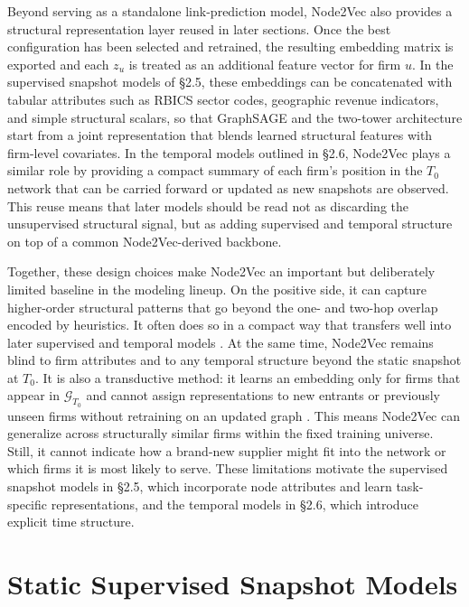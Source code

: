 Beyond serving as a standalone link-prediction model, Node2Vec also provides a structural representation layer reused in later sections. Once the best configuration has been selected and retrained, the resulting embedding matrix is exported and each \(z_u\) is treated as an additional feature vector for firm \(u\). In the supervised snapshot models of \S2.5, these embeddings can be concatenated with tabular attributes such as RBICS sector codes, geographic revenue indicators, and simple structural scalars, so that GraphSAGE and the two-tower architecture start from a joint representation that blends learned structural features with firm-level covariates. In the temporal models outlined in \S2.6, Node2Vec plays a similar role by providing a compact summary of each firm's position in the \(T_0\) network that can be carried forward or updated as new snapshots are observed. This reuse means that later models should be read not as discarding the unsupervised structural signal, but as adding supervised and temporal structure on top of a common Node2Vec-derived backbone.

Together, these design choices make Node2Vec an important but deliberately limited baseline in the modeling lineup. On the positive side, it can capture higher-order structural patterns that go beyond the one- and two-hop overlap encoded by heuristics. It often does so in a compact way that transfers well into later supervised and temporal models \parencite{grover_node2vec_2016,hamilton_representation_2017,cai_comprehensive_2018}. At the same time, Node2Vec remains blind to firm attributes and to any temporal structure beyond the static snapshot at \(T_0\). It is also a transductive method: it learns an embedding only for firms that appear in \(\mathcal{G}_{T_0}\) and cannot assign representations to new entrants or previously unseen firms without retraining on an updated graph \parencite{hamilton_representation_2017}. This means Node2Vec can generalize across structurally similar firms within the fixed training universe. Still, it cannot indicate how a brand-new supplier might fit into the network or which firms it is most likely to serve. These limitations motivate the supervised snapshot models in \S2.5, which incorporate node attributes and learn task-specific representations, and the temporal models in \S2.6, which introduce explicit time structure.


\section{Static Supervised Snapshot Models}

